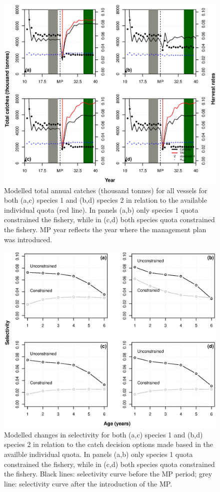 \documentclass[12pt,oneline,a4paper,numbib]{ouparticle}
\numberwithin{equation}{subsection} %
\begin{document}
\begin{figure}[!ht]
\centering
\includegraphics[width=\textwidth]{Figures/Catches.eps} 
\caption{Modelled total annual catches (thousand tonnes) for all vessels for both (a,c) species 1 and (b,d) species 2 in relation to the available individual quota (red line). In panels (a,b) only species 1 quota constrained the fishery, while in (c,d) both species quota constrained the fishery. MP year reflects the year where the management plan was introduced.}
\label{f:catches}
\end{figure}

\begin{figure}[!ht]
\centering
\includegraphics[width=\textwidth]{Figures/Selectivity.eps} 
\caption{Modelled changes in selectivity for both (a,c) species 1 and (b,d) species 2 in relation to the catch decision options made based in the availble individual quota. In panels (a,b) only species 1 quota constrained the fishery, while in (c,d) both species quota constrained the fishery. Black lines: selectivity curve before the MP period; grey line: selectivity curve after the introduction of the MP.}
\label{f:selectivity}
\end{figure}
\end{document}
